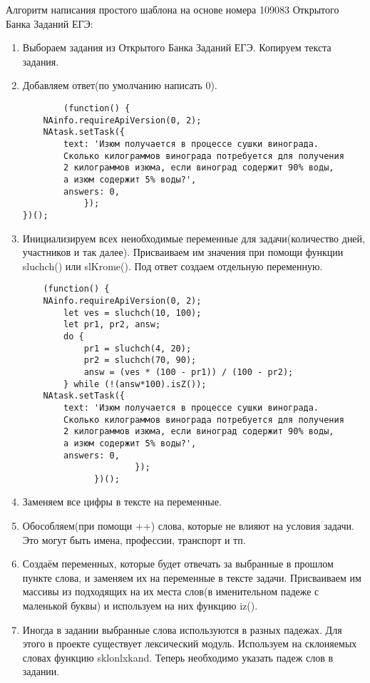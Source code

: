 Алгоритм написания простого шаблона на основе номера 109083 Открытого Банка Заданий ЕГЭ:%
\begin{enumerate}
    \item Выбораем задания из Открытого Банка Заданий ЕГЭ. Копируем текста задания.
    \item Добавляем ответ(по умолчанию написать 0).
          \begin{verbatim}
        (function() {
	NAinfo.requireApiVersion(0, 2);
    NAtask.setTask({
        text: 'Изюм получается в процессе сушки винограда. 
        Сколько килограммов винограда потребуется для получения 
        2 килограммов изюма, если виноград содержит 90% воды,
        а изюм содержит 5% воды?',
        answers: 0,
            });
})();
        \end{verbatim}
    \item Инициализируем всех неиобходимые переменные для задачи(количество дней, участников и так далее). Присваиваем им значения при помощи функции sluchch() или slKrome(). Под ответ создаем отдельную переменную.
          \begin{verbatim}     
    (function() {
    NAinfo.requireApiVersion(0, 2);
        let ves = sluchch(10, 100);
        let pr1, pr2, answ;
        do {
            pr1 = sluchch(4, 20);
            pr2 = sluchch(70, 90);
            answ = (ves * (100 - pr1)) / (100 - pr2);
        } while (!(answ*100).isZ());
    NAtask.setTask({
        text: 'Изюм получается в процессе сушки винограда.
        Сколько килограммов винограда потребуется для получения
        2 килограммов изюма, если виноград содержит 90% воды,
        а изюм содержит 5% воды?',
        answers: 0,
                      });
              })();
            \end{verbatim}
    \item Заменяем все цифры в тексте на переменные.
    \item Обособляем(при помощи ++) слова, которые не влияют на условия задачи. Это могут быть имена, профессии, транспорт и тп.
    \item Создаём переменных, которые будет отвечать за выбранные в прошлом пункте слова, и заменяем их на переменные в тексте задачи.
          Присваиваем им массивы из подходящих на их места слов(в именительном падеже с маленькой буквы) и используем на них функцию iz().
    \item Иногда в задании выбранные слова используются в разных падежах. Для этого в проекте существует лексический модуль. Используем на склоняемых словах функцию sklonlxkand. Теперь необходимо указать падеж слов в задании.

\end{enumerate}

